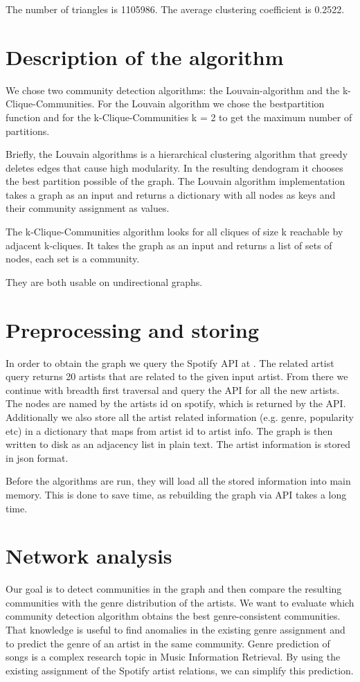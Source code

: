 \documentclass[11pt,a4paper,onecolumn,notitlepage]{article}
\begin{document}
The number of triangles is 1105986. The average clustering coefficient is 0.2522.

\section{Description of the algorithm}

We chose two community detection algorithms: the Louvain-algorithm\cite{louvain} and the k-Clique-Communities\cite{kclique}. For the Louvain algorithm we chose the bestpartition function and for the k-Clique-Communities k = 2 to get the maximum number of partitions.

Briefly, the Louvain algorithms is a hierarchical clustering algorithm that greedy deletes edges that cause high modularity. In the resulting dendogram it chooses the best partition possible of the graph. The Louvain algorithm implementation takes a graph as an input and returns a dictionary with all nodes as keys and their community assignment as values. 

The k-Clique-Communities algorithm looks for all cliques of size k reachable by adjacent k-cliques. It takes the graph as an input and returns a list of sets of nodes, each set is a community.

They are both usable on undirectional graphs.

\section{Preprocessing and storing}

In order to obtain the graph we query the Spotify API at \cite{spotifyapi}. The related artist query returns 20 artists that are related to the given input artist.
From there we continue with breadth first traversal and query the API for all the new artists.
The nodes are named by the artists id on spotify, which is returned by the API.
Additionally we also store all the artist related information (e.g. genre, popularity etc) in a dictionary that maps from artist id to artist info.
The graph is then written to disk as an adjacency list in plain text. The artist information is stored in json format.

Before the algorithms are run, they will load all the stored information into main memory. This is done to save time, as rebuilding the graph via API takes a long time.

\section{Network analysis}
Our goal is to detect communities in the graph and then compare the resulting communities with the genre distribution of the artists. We want to evaluate which community detection algorithm obtains the best genre-consistent communities. That knowledge is useful to find anomalies in the existing genre assignment and to predict the genre of an artist in the same community. Genre prediction of songs is a complex research topic in Music Information Retrieval. By using the existing assignment of the Spotify artist relations, we can simplify this prediction.
\end{document}
